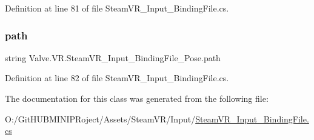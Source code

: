 Definition at line 81 of file Steam\+V\+R\+\_\+\+Input\+\_\+\+Binding\+File.\+cs.

\mbox{\label{class_valve_1_1_v_r_1_1_steam_v_r___input___binding_file___pose_adb574247e804d4580ab5c9316d91892a}} 
\subsubsection{\texorpdfstring{path}{path}}
{\footnotesize\ttfamily string Valve.\+V\+R.\+Steam\+V\+R\+\_\+\+Input\+\_\+\+Binding\+File\+\_\+\+Pose.\+path}



Definition at line 82 of file Steam\+V\+R\+\_\+\+Input\+\_\+\+Binding\+File.\+cs.



The documentation for this class was generated from the following file\+:\begin{DoxyCompactItemize}
\item 
O\+:/\+Git\+H\+U\+B\+M\+I\+N\+I\+P\+Roject/\+Assets/\+Steam\+V\+R/\+Input/\mbox{\hyperlink{_steam_v_r___input___binding_file_8cs}{Steam\+V\+R\+\_\+\+Input\+\_\+\+Binding\+File.\+cs}}\end{DoxyCompactItemize}
